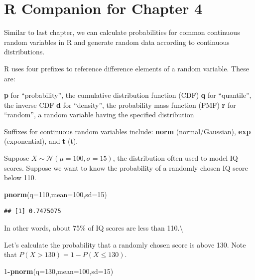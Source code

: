 \documentclass[
  11pt,
  oneside]{book}
\newenvironment{Shaded}{\begin{snugshade}}{\end{snugshade}}
\newcommand{\AttributeTok}[1]{\textcolor[rgb]{0.13,0.29,0.53}{#1}}
\newcommand{\DecValTok}[1]{\textcolor[rgb]{0.00,0.00,0.81}{#1}}
\newcommand{\FunctionTok}[1]{\textcolor[rgb]{0.13,0.29,0.53}{\textbf{#1}}}
\newcommand{\NormalTok}[1]{#1}
\newcommand{\SpecialCharTok}[1]{\textcolor[rgb]{0.81,0.36,0.00}{\textbf{#1}}}
\theoremstyle{definition}
\theoremstyle{definition}
\theoremstyle{definition}
\theoremstyle{definition}
\theoremstyle{remark}
\begin{document}
\newpage

\section{R Companion for Chapter 4}\label{r-companion-for-chapter-4}

Similar to last chapter, we can calculate probabilities for common continuous random variables in R and generate random data according to continuous distributions.

R uses four prefixes to reference difference elements of a random variable. These are:

\textbf{p} for ``probability'', the cumulative distribution function (CDF)
\textbf{q} for ``quantile'', the inverse CDF
\textbf{d} for ``density'', the probability mass function (PMF)
\textbf{r} for ``random'', a random variable having the specified distribution

Suffixes for continuous random variables include: \textbf{norm} (normal/Gaussian), \textbf{exp} (exponential), and \textbf{t} (t).

Suppose \(X \sim \mathcal{N}(\mu=100,\sigma=15)\), the distribution often used to model IQ scores. Suppose we want to know the probability of a randomly chosen IQ score below 110.

\begin{Shaded}
\begin{Highlighting}[]
\FunctionTok{pnorm}\NormalTok{(}\AttributeTok{q=}\DecValTok{110}\NormalTok{,}\AttributeTok{mean=}\DecValTok{100}\NormalTok{,}\AttributeTok{sd=}\DecValTok{15}\NormalTok{)}
\end{Highlighting}
\end{Shaded}

\begin{verbatim}
## [1] 0.7475075
\end{verbatim}

In other words, about 75\% of IQ scores are less than 110.\textbackslash{}

Let's calculate the probability that a randomly chosen score is above 130. Note that \(P(X>130) = 1 - P(X \leq 130)\).

\begin{Shaded}
\begin{Highlighting}[]
\DecValTok{1}\SpecialCharTok{{-}}\FunctionTok{pnorm}\NormalTok{(}\AttributeTok{q=}\DecValTok{130}\NormalTok{,}\AttributeTok{mean=}\DecValTok{100}\NormalTok{,}\AttributeTok{sd=}\DecValTok{15}\NormalTok{)}
\end{Highlighting}
\end{Shaded}
\end{document}
